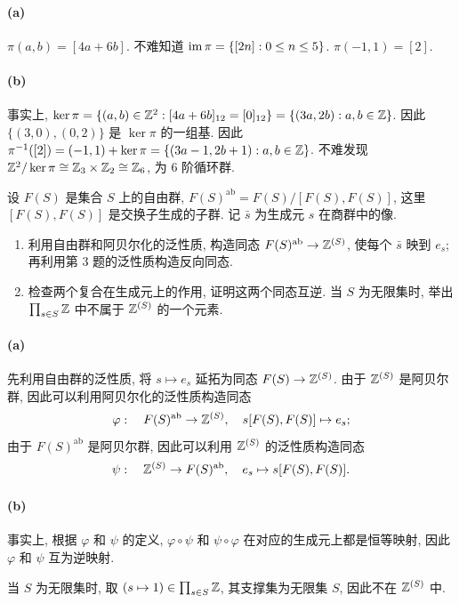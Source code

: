 \documentclass{article}
\begin{document}
\begin{solution}
	\paragraph{(a)} $\pi(a, b) = [4a + 6b]$. 不难知道 $\operatorname{im} \pi = \{[2n]: 0 \le n \le 5\}$. $\pi(-1, 1) = [2]$. 

	\paragraph{(b)} 事实上, $\ker \pi = \{(a,b) \in \mathbb{Z}^2: [4a+6b]_{12} = [0]_{12}\} = \{(3a, 2b): a, b \in \mathbb{Z}\}$. 因此 $\{(3, 0), (0, 2)\}$ 是 $\ker \pi$ 的一组基. 因此 $\pi^{-1}([2]) = (-1, 1) + \ker \pi = \{(3a - 1, 2b + 1): a, b \in \mathbb{Z}\}$. 不难发现 $\mathbb{Z}^2 / \ker \pi \cong \mathbb{Z}_3 \times \mathbb{Z}_2 \cong \mathbb{Z}_6$, 为 $6$ 阶循环群.
\end{solution}



\begin{problem}
设 $F(S)$ 是集合 $S$ 上的自由群, $F(S)^{\mathrm{ab}}=F(S)/[F(S),F(S)]$, 这里 $[F(S),F(S)]$ 是交换子生成的子群. 记 $\bar s$ 为生成元 $s$ 在商群中的像.
\begin{enumerate}
  \item[(a)] 利用自由群和阿贝尔化的泛性质, 构造同态 $F(S)^{\mathrm{ab}}\to\mathbb{Z}^{(S)}$, 使每个 $\bar s$ 映到 $e_s$; 再利用第 3 题的泛性质构造反向同态.
  \item[(b)] 检查两个复合在生成元上的作用, 证明这两个同态互逆. 当 $S$ 为无限集时, 举出 $\prod_{s\in S}\mathbb{Z}$ 中不属于 $\mathbb{Z}^{(S)}$ 的一个元素.
\end{enumerate}
\end{problem}

\begin{solution}
	\paragraph{(a)} 先利用自由群的泛性质, 将 $s \mapsto e_s$ 延拓为同态 $F(S) \to \mathbb{Z}^{(S)}$. 由于 $\mathbb{Z}^{(S)}$ 是阿贝尔群, 因此可以利用阿贝尔化的泛性质构造同态
	\[ \varphi: \quad F(S)^{\mathrm{ab}} \to \mathbb{Z}^{(S)}, \quad s[F(S), F(S)] \mapsto e_s; \]
	由于 $F(S)^{\mathrm{ab}}$ 是阿贝尔群, 因此可以利用 $\mathbb{Z}^{(S)}$ 的泛性质构造同态
	\[ \psi: \quad \mathbb{Z}^{(S)} \to F(S)^{\mathrm{ab}}, \quad e_s \mapsto s[F(S), F(S)]. \]

	\paragraph{(b)} 事实上, 根据 $\varphi$ 和 $\psi$ 的定义, $\varphi \circ \psi$ 和 $\psi \circ \varphi$ 在对应的生成元上都是恒等映射, 因此 $\varphi$ 和 $\psi$ 互为逆映射. 

	当 $S$ 为无限集时, 取 $(s \mapsto 1) \in \prod_{s \in S}^{}\mathbb{Z}$, 其支撑集为无限集 $S$, 因此不在 $\mathbb{Z}^{(S)}$ 中.
\end{solution}
\end{document}
